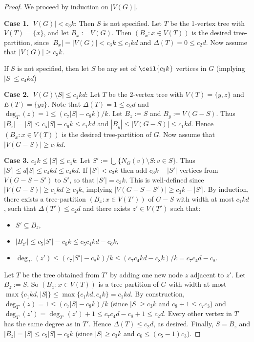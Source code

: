 \begin{proof}
We proceed by induction on $|V(G)$|.

\textbf{Case 1.} $|V(G)| < c_3 k$: Then $S$ is not specified. Let $T$ be the 1-vertex tree with $V(T)=\{x\}$, and let $B_x:=V(G)$. Then $(B_x:x\in V(T))$ is the desired tree-partition, since $|B_x|=|V(G)|<c_3 k \leq c_1 kd$ and $\Delta(T)=0\leq c_2d$. Now assume that $|V(G)| \geq c_3 k$. 

If $S$ is not specified, then let $S$ be any set of $\ceil{c_3k}$ vertices in $G$ (implying $|S|\leq c_4kd$)

\textbf{Case 2.} $|V(G)\setminus S|\leq c_1kd$: Let $T$ be the 2-vertex tree with $V(T)=\{y,z\}$ and $E(T)=\{yz\}$. Note that $\Delta(T)=1\leq c_2 d$ and $\deg_T(z)=1\leq (c_7|S|-c_8k)/k$. Let $B_z:=S$ and $B_y:=V(G-S)$. Thus $|B_z|=|S|\leq c_5|S|-c_6k\leq c_1kd$ and $|B_y|\leq |V(G-S)|\leq c_1kd$. Hence $(B_x:x\in V(T))$ is the desired tree-partition of $G$. Now assume that $|V(G-S)|\geq c_1kd$.

\textbf{Case 3.} $c_3k \leq |S|\leq c_4 k$: Let $S':=\bigcup\{ N_G(v)\setminus S: v\in S\}$. Thus $|S'|\leq d |S|\leq c_4 kd\leq c_4kd$. If $|S'|< c_3 k$ then add $c_3k-|S'|$ vertices from $V(G-S-S')$ to $S'$, so that $|S'|=c_3k$. This is well-defined since 
$|V(G-S)| \geq c_1kd \geq c_3k$, implying $|V(G-S-S')| \geq c_3k-|S'|$.
By induction, there exists a tree-partition $(B_x:x\in V(T'))$ of $G-S$ with width at most $c_1 kd$, such that $\Delta(T')\leq c_2d$ and there exists $z'\in V(T')$ such that:
\begin{itemize}
    \item $S'\subseteq B_z$, 
    \item $|B_{z'}|\leq c_5|S'|-c_6k \leq c_5c_4kd -c_6k$,
    \item $\deg_{T'}(z')\leq ( c_7 |S'| - c_8 k)/k \leq (c_7 c_4kd-c_8k)/k= c_7c_4d-c_8$.
\end{itemize}
Let $T$ be the tree obtained from $T'$ by adding one new node $z$ adjacent to $z'$. Let $B_z:=S$. So $(B_x:x\in V(T))$ is a tree-partition of $G$ with width at most $\max\{c_1kd,|S|\}\leq\max\{c_1kd,c_4k\}=c_1kd$. By construction, $\deg_T(z)=1 \leq ( c_7 |S| - c_8 k)/k$ (since $|S|\geq c_3k$ and $c_8+1 \leq c_7 c_3  $) and $\deg_{T}(z') = \deg_{T'}(z')+1\leq c_7 c_4d - c_8 + 1  \leq c_2d$. Every other vertex in $T$ has the same degree as in $T'$. Hence $\Delta(T)\leq c_2d$, as desired. Finally, $S=B_z$ and $|B_z|=|S| \leq c_5 |S|-c_6k$ (since $|S|\geq c_3k$ and $c_6 \leq (c_5-1) c_3$).


\end{proof}
